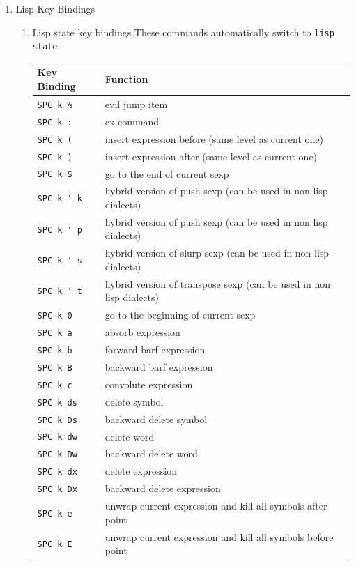 \documentclass[11pt]{article}
\begin{document}
\begin{enumerate}
\item Lisp Key Bindings
\label{sec:org628abbd}
\begin{enumerate}
\item Lisp state key bindings
\label{sec:org89540f8}
These commands automatically switch to \texttt{lisp state}.

\begin{center}
\begin{tabular}{ll}
Key Binding & Function\\
\hline
\texttt{SPC k \%} & evil jump item\\
\texttt{SPC k :} & ex command\\
\texttt{SPC k (} & insert expression before (same level as current one)\\
\texttt{SPC k )} & insert expression after (same level as current one)\\
\texttt{SPC k \$} & go to the end of current sexp\\
\texttt{SPC k ` k} & hybrid version of push sexp (can be used in non lisp dialects)\\
\texttt{SPC k ` p} & hybrid version of push sexp (can be used in non lisp dialects)\\
\texttt{SPC k ` s} & hybrid version of slurp sexp (can be used in non lisp dialects)\\
\texttt{SPC k ` t} & hybrid version of transpose sexp (can be used in non lisp dialects)\\
\texttt{SPC k 0} & go to the beginning of current sexp\\
\texttt{SPC k a} & absorb expression\\
\texttt{SPC k b} & forward barf expression\\
\texttt{SPC k B} & backward barf expression\\
\texttt{SPC k c} & convolute expression\\
\texttt{SPC k ds} & delete symbol\\
\texttt{SPC k Ds} & backward delete symbol\\
\texttt{SPC k dw} & delete word\\
\texttt{SPC k Dw} & backward delete word\\
\texttt{SPC k dx} & delete expression\\
\texttt{SPC k Dx} & backward delete expression\\
\texttt{SPC k e} & unwrap current expression and kill all symbols after point\\
\texttt{SPC k E} & unwrap current expression and kill all symbols before point\\

\end{tabular}
\end{center}
\end{enumerate}
\end{enumerate}
\end{document}
